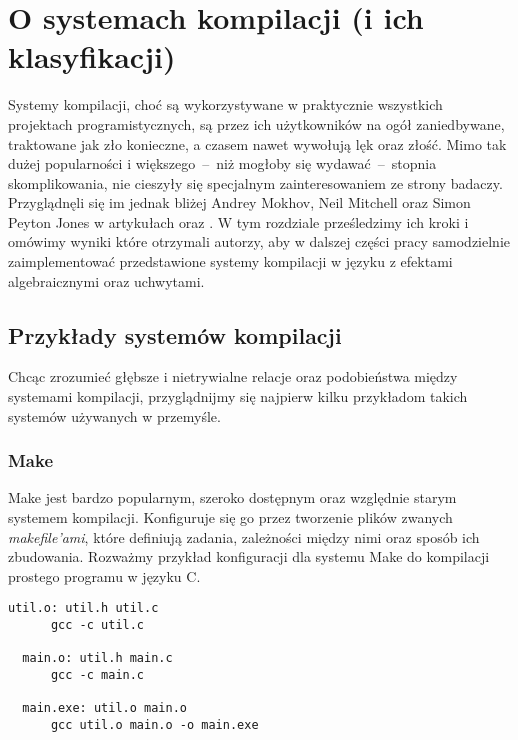 
\newcommand{\inl}[1]{\lstinline[style=haskell-inl]{#1}}

\chapter{O systemach kompilacji (i ich klasyfikacji)}
\label{chapter-bsalc}

Systemy kompilacji, choć są wykorzystywane w praktycznie wszystkich projektach programistycznych, są przez ich użytkowników na ogół zaniedbywane, traktowane jak zło konieczne, a czasem nawet wywołują lęk oraz złość. Mimo tak dużej popularności i większego~--~niż mogłoby się wydawać~--~stopnia skomplikowania, nie cieszyły się specjalnym zainteresowaniem ze strony badaczy. Przyglądnęli się im jednak bliżej Andrey Mokhov, Neil Mitchell oraz Simon Peyton Jones w artykułach \BSaLC\cite{mokhov2018build} oraz \BSaLCTP\cite{mokhov2020build}. W tym rozdziale prześledzimy ich kroki i omówimy wyniki które otrzymali autorzy, aby w dalszej części pracy samodzielnie zaimplementować przedstawione systemy kompilacji w języku z efektami algebraicznymi oraz uchwytami.

\section{Przykłady systemów kompilacji}

Chcąc zrozumieć głębsze i nietrywialne relacje oraz podobieństwa między systemami kompilacji, przyglądnijmy się najpierw kilku przykładom takich systemów używanych w przemyśle.

\subsection{Make}

Make jest bardzo popularnym, szeroko dostępnym oraz względnie starym systemem kompilacji. Konfiguruje się go przez tworzenie plików zwanych \textit{makefile'ami}, które definiują zadania, zależności między nimi oraz sposób ich zbudowania. Rozważmy przykład konfiguracji dla systemu Make do kompilacji prostego programu w języku C.

\pagebreak

\lstset{language=make}

\begin{lstlisting}[basicstyle=\scriptsize\ttfamily, float=h, title={Przykładowa konfiguracja systemu Make}]
  util.o: util.h util.c
      gcc -c util.c

  main.o: util.h main.c
      gcc -c main.c

  main.exe: util.o main.o
      gcc util.o main.o -o main.exe
\end{lstlisting}

